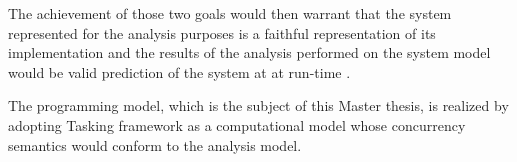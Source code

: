 The achievement of those two goals would then warrant that the system represented for the analysis purposes is a faithful representation of its implementation and the results of the analysis performed on the system model would be valid prediction of the system at at run-time \cite{PhdThesis}.

The programming model, which is the subject of this Master thesis, is realized by adopting Tasking framework as a computational model whose concurrency semantics would conform to the analysis model.     
